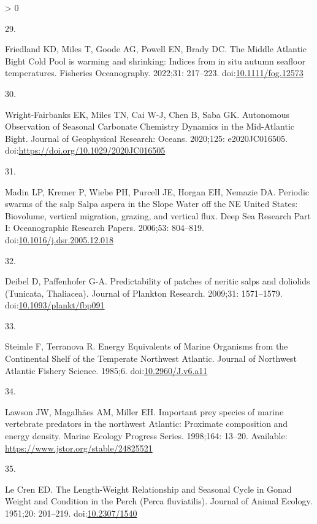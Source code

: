 \documentclass[
  10pt,
]{article}
\newlength{\cslhangindent}
\newlength{\csllabelwidth}
\newenvironment{CSLReferences}[2] %
 {%
  \setlength{\parindent}{0pt}
  \ifodd #1 \everypar{\setlength{\hangindent}{\cslhangindent}}\ignorespaces\fi
  \ifnum #2 > 0
  \setlength{\parskip}{#2\baselineskip}
  \fi
 }%
 {}
\newcommand{\CSLLeftMargin}[1]{\parbox[t]{\csllabelwidth}{#1}}
\newcommand{\CSLRightInline}[1]{\parbox[t]{\linewidth - \csllabelwidth}{#1}\break}
\begin{document}
\begin{CSLReferences}{0}{0}
\leavevmode\hypertarget{ref-friedland_middle_2022}{}%
\CSLLeftMargin{29. }
\CSLRightInline{Friedland KD, Miles T, Goode AG, Powell EN, Brady DC.
The {Middle} {Atlantic} {Bight} {Cold} {Pool} is warming and shrinking:
{Indices} from in situ autumn seafloor temperatures. Fisheries
Oceanography. 2022;31: 217--223.
doi:\href{https://doi.org/10.1111/fog.12573}{10.1111/fog.12573}}

\leavevmode\hypertarget{ref-wrightfairbanks_autonomous_2020}{}%
\CSLLeftMargin{30. }
\CSLRightInline{Wright‐Fairbanks EK, Miles TN, Cai W-J, Chen B, Saba GK.
Autonomous {Observation} of {Seasonal} {Carbonate} {Chemistry}
{Dynamics} in the {Mid}-{Atlantic} {Bight}. Journal of Geophysical
Research: Oceans. 2020;125: e2020JC016505.
doi:\url{https://doi.org/10.1029/2020JC016505}}

\leavevmode\hypertarget{ref-madin_periodic_2006}{}%
\CSLLeftMargin{31. }
\CSLRightInline{Madin LP, Kremer P, Wiebe PH, Purcell JE, Horgan EH,
Nemazie DA. Periodic swarms of the salp {Salpa} aspera in the {Slope}
{Water} off the {NE} {United} {States}: {Biovolume}, vertical migration,
grazing, and vertical flux. Deep Sea Research Part I: Oceanographic
Research Papers. 2006;53: 804--819.
doi:\href{https://doi.org/10.1016/j.dsr.2005.12.018}{10.1016/j.dsr.2005.12.018}}

\leavevmode\hypertarget{ref-deibel_predictability_2009}{}%
\CSLLeftMargin{32. }
\CSLRightInline{Deibel D, Paffenhofer G-A. Predictability of patches of
neritic salps and doliolids ({Tunicata}, {Thaliacea}). Journal of
Plankton Research. 2009;31: 1571--1579.
doi:\href{https://doi.org/10.1093/plankt/fbp091}{10.1093/plankt/fbp091}}

\leavevmode\hypertarget{ref-steimle_energy_1985}{}%
\CSLLeftMargin{33. }
\CSLRightInline{Steimle F, Terranova R. Energy {Equivalents} of {Marine}
{Organisms} from the {Continental} {Shelf} of the {Temperate}
{Northwest} {Atlantic}. Journal of Northwest Atlantic Fishery Science.
1985;6. doi:\href{https://doi.org/10.2960/J.v6.a11}{10.2960/J.v6.a11}}

\leavevmode\hypertarget{ref-lawson_important_1998}{}%
\CSLLeftMargin{34. }
\CSLRightInline{Lawson JW, Magalhães AM, Miller EH. Important prey
species of marine vertebrate predators in the northwest {Atlantic}:
Proximate composition and energy density. Marine Ecology Progress
Series. 1998;164: 13--20. Available:
\url{https://www.jstor.org/stable/24825521}}

\leavevmode\hypertarget{ref-le_cren_length-weight_1951}{}%
\CSLLeftMargin{35. }
\CSLRightInline{Le Cren ED. The {Length}-{Weight} {Relationship} and
{Seasonal} {Cycle} in {Gonad} {Weight} and {Condition} in the {Perch}
({Perca} fluviatilis). Journal of Animal Ecology. 1951;20: 201--219.
doi:\href{https://doi.org/10.2307/1540}{10.2307/1540}}


\end{CSLReferences}
\end{document}
